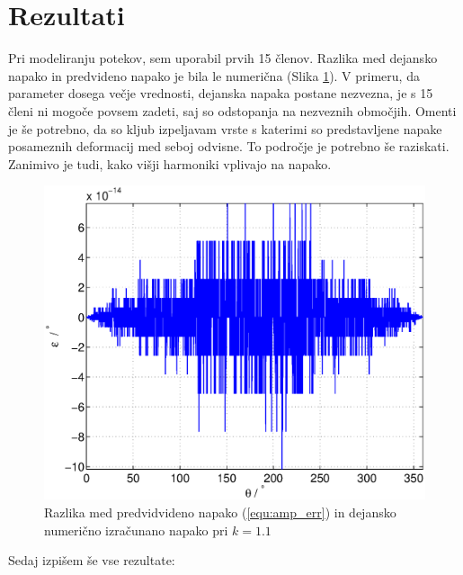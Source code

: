 \documentclass[a4paper]{article}
\begin{document}
\section{Rezultati}

Pri modeliranju potekov, sem uporabil prvih 15 členov. Razlika med dejansko napako in predvideno napako je bila le numerična (Slika \ref{fig:razlika}). V primeru, da parameter dosega večje vrednosti, dejanska napaka postane nezvezna, je s 15 členi ni mogoče povsem zadeti, saj so odstopanja na nezveznih območjih. Omenti je še potrebno, da so kljub izpeljavam vrste s katerimi so predstavljene napake posameznih deformacij med seboj odvisne. To področje je potrebno še raziskati. Zanimivo je tudi, kako višji harmoniki vplivajo na napako.

\begin{figure}[!htb]
	\begin{center}
		\includegraphics[width=\linewidth]{./Slike/razlika_amp.eps}
		\caption{Razlika med predvidvideno napako (\ref{equ:amp_err}) in dejansko numerično izračunano napako pri $k=1.1$} \label{fig:razlika}
	\end{center}
\end{figure}


Sedaj izpišem še vse rezultate:
\end{document}
